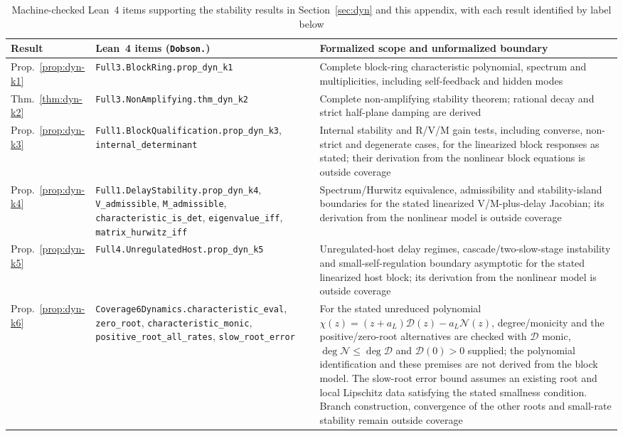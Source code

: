 \begin{table}[ht]
\caption{Machine-checked Lean~4 items supporting the stability results in Section~\ref{sec:dyn} and this appendix, with each result identified by label below}\label{tab:dyn-lean}
\footnotesize
\begin{tabular*}{\textwidth}{@{\extracolsep\fill}lp{}p{}@{}}
\toprule
Result & \raggedright Lean~4 items (\texttt{Dobson.}) & \raggedright Formalized scope and unformalized boundary \tabularnewline
\midrule
Prop.~\ref{prop:dyn-k1} & \raggedright \texttt{Full3.BlockRing.}\allowbreak\texttt{prop\_dyn\_k1} & \raggedright Complete block-ring characteristic polynomial, spectrum and multiplicities, including self-feedback and hidden modes \tabularnewline
Thm.~\ref{thm:dyn-k2} & \raggedright \texttt{Full3.NonAmplifying.}\allowbreak\texttt{thm\_dyn\_k2} & \raggedright Complete non-amplifying stability theorem; rational decay and strict half-plane damping are derived \tabularnewline
Prop.~\ref{prop:dyn-k3} & \raggedright \texttt{Full1.}\allowbreak\texttt{BlockQualification.}\allowbreak\texttt{prop\_dyn\_k3}, \texttt{internal\_determinant} & \raggedright Internal stability and R/V/M gain tests, including converse, non-strict and degenerate cases, for the linearized block responses as stated; their derivation from the nonlinear block equations is outside coverage \tabularnewline
Prop.~\ref{prop:dyn-k4} & \raggedright \texttt{Full1.DelayStability.}\allowbreak\texttt{prop\_dyn\_k4}, \texttt{V\_admissible}, \texttt{M\_admissible}, \texttt{characteristic\_is\_det}, \texttt{eigenvalue\_iff}, \texttt{matrix\_hurwitz\_iff} & \raggedright Spectrum/Hurwitz equivalence, admissibility and stability-island boundaries for the stated linearized V/M-plus-delay Jacobian; its derivation from the nonlinear model is outside coverage \tabularnewline
Prop.~\ref{prop:dyn-k5} & \raggedright \texttt{Full4.}\allowbreak\texttt{UnregulatedHost.}\allowbreak\texttt{prop\_dyn\_k5} & \raggedright Unregulated-host delay regimes, cascade/two-slow-stage instability and small-self-regulation boundary asymptotic for the stated linearized host block; its derivation from the nonlinear model is outside coverage \tabularnewline
Prop.~\ref{prop:dyn-k6} & \raggedright \texttt{Coverage6Dynamics.}\allowbreak\texttt{characteristic\_eval}, \texttt{zero\_root}, \texttt{characteristic\_monic}, \texttt{positive\_root\_all\_rates}, \texttt{slow\_root\_error} & \raggedright For the stated unreduced polynomial $\chi(z)=(z+a_L)\mathcal{D}(z)-a_L\mathcal{N}(z)$, degree/monicity and the positive/zero-root alternatives are checked with $\mathcal{D}$ monic, $\deg\mathcal{N}\le\deg\mathcal{D}$ and $\mathcal{D}(0)>0$ supplied; the polynomial identification and these premises are not derived from the block model. The slow-root error bound assumes an existing root and local Lipschitz data satisfying the stated smallness condition. Branch construction, convergence of the other roots and small-rate stability remain outside coverage \tabularnewline

\end{tabular*}
\end{table}
